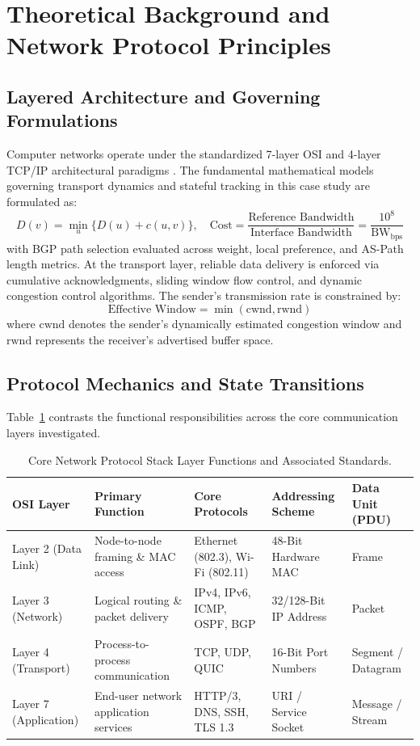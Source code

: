 \section{Theoretical Background and Network Protocol Principles}

\subsection{Layered Architecture and Governing Formulations}
Computer networks operate under the standardized 7-layer OSI and 4-layer TCP/IP architectural paradigms \cite{stallings2017data}. The fundamental mathematical models governing transport dynamics and stateful tracking in this case study are formulated as:
\begin{equation}
  D(v) = \min_{u} \{D(u) + c(u, v)\}, \quad \text{Cost} = \frac{\text{Reference Bandwidth}}{\text{Interface Bandwidth}} = \frac{10^8}{\text{BW}_{\text{bps}}}
\label{eq:core_math}
\end{equation}
with BGP path selection evaluated across weight, local preference, and AS-Path length metrics.
At the transport layer, reliable data delivery is enforced via cumulative acknowledgments, sliding window flow control, and dynamic congestion control algorithms. The sender's transmission rate is constrained by:
\begin{equation}
  \text{Effective Window} = \min(\text{cwnd}, \text{rwnd})
\end{equation}
where $\text{cwnd}$ denotes the sender's dynamically estimated congestion window and $\text{rwnd}$ represents the receiver's advertised buffer space.

\subsection{Protocol Mechanics and State Transitions}
Table~\ref{tab:layer_comp} contrasts the functional responsibilities across the core communication layers investigated.
\begin{table}[H]
\centering
\caption{Core Network Protocol Stack Layer Functions and Associated Standards.}
\label{tab:layer_comp}
\begin{tabularx}{\linewidth}{lXXXX}
\toprule
\textbf{OSI Layer} & \textbf{Primary Function} & \textbf{Core Protocols} & \textbf{Addressing Scheme} & \textbf{Data Unit (PDU)} \\
\midrule
Layer 2 (Data Link) & Node-to-node framing \& MAC access & Ethernet (802.3), Wi-Fi (802.11) & 48-Bit Hardware MAC & Frame \\
Layer 3 (Network) & Logical routing \& packet delivery & IPv4, IPv6, ICMP, OSPF, BGP & 32/128-Bit IP Address & Packet \\
Layer 4 (Transport) & Process-to-process communication & TCP, UDP, QUIC & 16-Bit Port Numbers & Segment / Datagram \\
Layer 7 (Application) & End-user network application services & HTTP/3, DNS, SSH, TLS 1.3 & URI / Service Socket & Message / Stream \\
\bottomrule
\end{tabularx}
\end{table}

